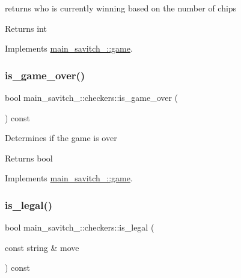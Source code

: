 returns who is currently winning based on the number of chips \begin{DoxyReturn}{Returns}
int 
\end{DoxyReturn}


Implements \hyperlink{classmain__savitch__14_1_1game}{main\+\_\+savitch\+\_\+::game}.

\mbox{\label{classmain__savitch__14_1_1checkers_ab8481b1a443f4b190d3ff508ab6f62a7}} 
\subsubsection{\texorpdfstring{is\+\_\+game\+\_\+over()}{is\_game\_over()}}
{\footnotesize\ttfamily bool main\+\_\+savitch\+\_\+::checkers\+::is\+\_\+game\+\_\+over (\begin{DoxyParamCaption}{ }\end{DoxyParamCaption}) const\hspace{0.3cm}{\ttfamily [virtual]}}

Determines if the game is over \begin{DoxyReturn}{Returns}
bool 
\end{DoxyReturn}


Implements \hyperlink{classmain__savitch__14_1_1game}{main\+\_\+savitch\+\_\+::game}.

\mbox{\label{classmain__savitch__14_1_1checkers_afc7d56fe1f0637a02cad352e9cda9ee3}} 
\subsubsection{\texorpdfstring{is\+\_\+legal()}{is\_legal()}}
{\footnotesize\ttfamily bool main\+\_\+savitch\+\_\+::checkers\+::is\+\_\+legal (\begin{DoxyParamCaption}\item[{const string \&}]{move }\end{DoxyParamCaption}) const}

